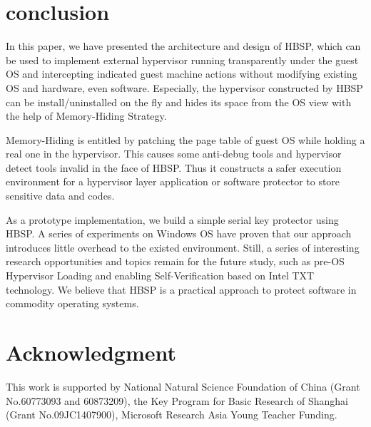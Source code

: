 \documentclass[conference]{IEEEtran}
\begin{document}
{\bigskip

\section{conclusion}
In this paper, we have presented the architecture and design of
HBSP, which can be used to implement external hypervisor running
transparently under the guest OS and intercepting indicated guest
machine actions without modifying existing OS and hardware, even
software. Especially, the hypervisor constructed by HBSP can be
install/uninstalled on the fly and hides its space from the OS
view with the help of Memory-Hiding Strategy.

Memory-Hiding is entitled by patching the page table of guest OS
while holding a real one in the hypervisor. This causes some
anti-debug tools and hypervisor detect tools invalid in the face
of HBSP. Thus it constructs a safer execution environment for a
hypervisor layer application or software protector to store
sensitive data and codes.

As a prototype implementation, we build a simple serial key
protector using HBSP. A series of experiments on Windows OS have
proven that our approach introduces little overhead to the existed
environment. Still, a series of interesting research opportunities
and topics remain for the future study, such as pre-OS Hypervisor
Loading and enabling Self-Verification based on Intel TXT
technology. We believe that HBSP is a practical approach to protect
software in commodity operating systems.
\bigskip

\section*{Acknowledgment}
This work is supported by National Natural Science Foundation of
China (Grant No.60773093 and 60873209), the Key Program for Basic
Research of Shanghai (Grant No.09JC1407900), Microsoft Research Asia
Young Teacher Funding.

\bigskip

}
\end{document}

